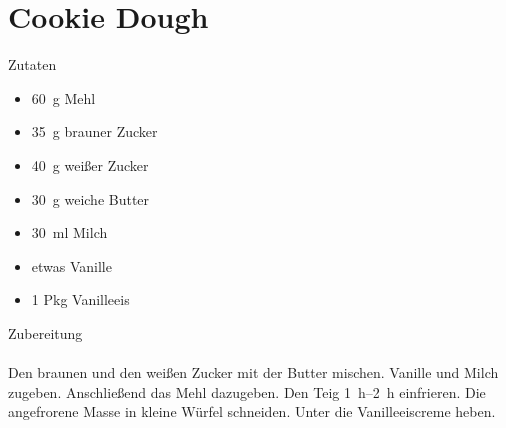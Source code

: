 \section*{Cookie Dough}
\ihead{}\ohead{}
\cfoot{}
{\Large Zutaten}
\begin{multicols}{2}
\begin{itemize}
    \item \SI{60}{g} Mehl
    \item \SI{35}{g} brauner Zucker
    \item \SI{40}{g} weißer Zucker
    \item \SI{30}{g} weiche Butter
    \item \SI{30}{ml} Milch
    \item etwas Vanille
    \item \num{1} Pkg Vanilleeis
\end{itemize}
\end{multicols}
\noindent
{\Large Zubereitung}\\
\\
Den braunen und den weißen Zucker mit der Butter mischen. 
Vanille und Milch zugeben.
Anschließend das Mehl dazugeben.
Den Teig \SIrange{1}{2}{h} einfrieren. 
Die angefrorene Masse in kleine Würfel schneiden.
Unter die Vanilleeiscreme heben.